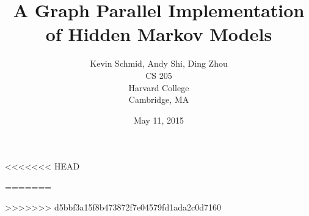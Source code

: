 \documentclass[letterpaper,11pt]{article}
\begin{document}
\title{A Graph Parallel Implementation of Hidden Markov Models}
\author{Kevin Schmid, Andy Shi, Ding Zhou \\ CS 205 \\
Harvard College \\ Cambridge, MA}
\date{May 11, 2015}
\maketitle




\begin{abstract}
    
\end{abstract}

\begin{multicols*}{2}



<<<<<<< HEAD

=======





>>>>>>> d5bbf3a15f8b473872f7e04579fd1ada2c0d7160




\end{multicols*}
\end{document}
